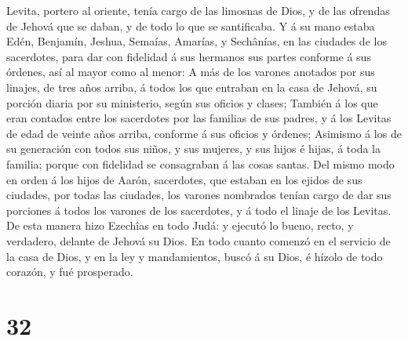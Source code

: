 Levita, portero al oriente, tenía cargo de las limosnas de Dios, y de
las ofrendas de Jehová que se daban, y de todo lo que se santificaba.
 Y á su mano estaba Edén, Benjamín, Jeshua, Semaías,
Amarías, y Sechânías, en las ciudades de los sacerdotes, para dar con
fidelidad á sus hermanos sus partes conforme á sus órdenes, así al mayor
como al menor:  A más de los varones anotados por sus
linajes, de tres años arriba, á todos los que entraban en la casa de
Jehová, su porción diaria por su ministerio, según sus oficios y clases;
 También á los que eran contados entre los sacerdotes por
las familias de sus padres, y á los Levitas de edad de veinte años
arriba, conforme á sus oficios y órdenes;  Asimismo á los
de su generación con todos sus niños, y sus mujeres, y sus hijos é
hijas, á toda la familia; porque con fidelidad se consagraban á las
cosas santas.  Del mismo modo en orden á los hijos de
Aarón, sacerdotes, que estaban en los ejidos de sus ciudades, por todas
las ciudades, los varones nombrados tenían cargo de dar sus porciones á
todos los varones de los sacerdotes, y á todo el linaje de los Levitas.
 De esta manera hizo Ezechîas en todo Judá: y ejecutó lo
bueno, recto, y verdadero, delante de Jehová su Dios.  En
todo cuanto comenzó en el servicio de la casa de Dios, y en la ley y
mandamientos, buscó á su Dios, é hízolo de todo corazón, y fué
prosperado.

\hypertarget{section-31}{%
\section{32}\label{section-31}}

